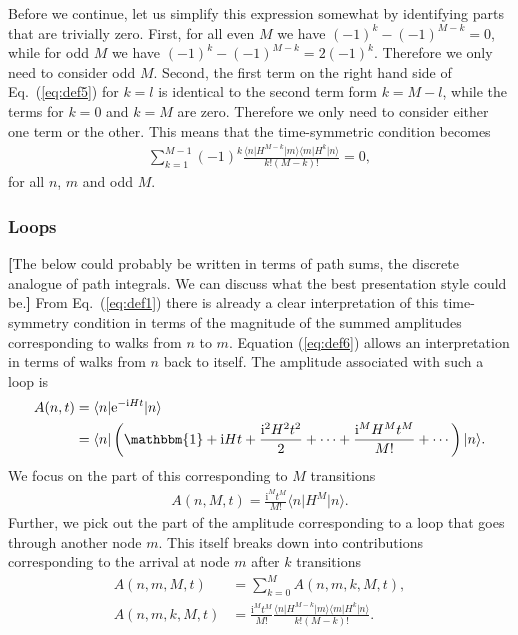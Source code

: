 \documentclass[aps,pra,12pt,nofootinbib,superscriptaddress,longbibliography,showpacs]{revtex4-1}
\newcommand{\yo}[1]{\textcolor{dblue}{\textbf{[}#1\textbf{]}}}
\theoremstyle{plain}
\theoremstyle{definition}
\newcommand{\bra}[1]{\mbox{$\langle #1|$}}
\newcommand{\ket}[1]{\ensuremath{|#1\rangle}}
\newcommand{\eee}{\mathrm{e}}
\newcommand{\ii}{\mathrm{i}}
\newcommand{\eqr}[1]{Eq.~(\ref{#1})}
\begin{document}
Before we continue, let us simplify this expression somewhat by identifying parts that are trivially zero. First, for all even $M$ we have $(-1)^k - (-1)^{M-k} = 0$, while for odd $M$ we have $(-1)^k - (-1)^{M-k} = 2 (-1)^k$. Therefore we only need to consider odd $M$. Second, the first term on the right hand side of \eqr{eq:def5} for $k = l$ is identical to the second term form $k = M -l$, while the terms for $k = 0$ and $k = M$ are zero. Therefore we only need to consider either one term or the other. This means that the time-symmetric condition becomes
\begin{align}
\label{eq:def6}
  \sum_{k=1 }^{M-1} (-1)^k \frac{   \bra{n} H^{M-k} \ket{m} \bra{m} H^k \ket{n}}{k! (M-k)!}   = 0 ,
\end{align}
for all $n$, $m$ and odd $M$. 

\subsubsection{Loops}
\yo{The below could probably be written in terms of path sums, the discrete analogue of path integrals. We can discuss what the best presentation style could be.}
From \eqr{eq:def1} there is already a clear interpretation of this time-symmetry condition in terms of the magnitude of the summed amplitudes corresponding to walks from $n$ to $m$. Equation (\ref{eq:def6}) allows an interpretation in terms of walks from $n$ back to itself. The amplitude associated with such a loop is
\begin{subequations}
\label{eq:loopamp}
\begin{align}
A(n,t) &= \bra{n} \eee^{-\ii H t} \ket{n} \\
&= \bra{n} \left( \mathbbm{1} + \ii H t + \frac{\ii^2 H^2 t^2}{2} + \cdots + \frac{\ii^M H^M t^M}{M!} + \cdots  \right) \ket{n}.
\end{align}
\end{subequations}
We focus on the part of this corresponding to $M$ transitions
\begin{align}
\label{eq:Mloopamp}
A(n,M,t) = \frac{ \ii^M t^M}{M!} \bra{n} H^M \ket{n}.
\end{align}
Further, we pick out the part of the amplitude corresponding to a loop that goes through another node $m$. This itself breaks down into contributions corresponding to the arrival at node $m$ after $k$ transitions
\begin{subequations}
\label{eq:mMloopamp}
\begin{align}
A(n,m,M,t) &= \sum_{k=0}^M A(n,m,k,M,t) , \\
A(n,m,k,M,t) &=\frac{ \ii^M t^{M} }{ M!} \frac{ \bra{n} H^{M-k} \ket{m} \bra{m}  H^k \ket{n} }{k! (M-k)! }  .
\end{align}
\end{subequations}
\end{document}
